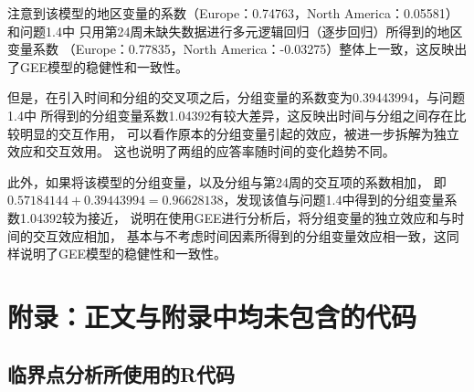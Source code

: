 \documentclass{article}
\begin{document}
注意到该模型的地区变量的系数（Europe：0.74763，North America：0.05581）和问题1.4中
只用第24周未缺失数据进行多元逻辑回归（逐步回归）所得到的地区变量系数
（Europe：0.77835，North America：-0.03275）整体上一致，这反映出了GEE模型的稳健性和一致性。

但是，在引入时间和分组的交叉项之后，分组变量的系数变为0.39443994，与问题1.4中
所得到的分组变量系数1.04392有较大差异，这反映出时间与分组之间存在比较明显的交互作用，
可以看作原本的分组变量引起的效应，被进一步拆解为独立效应和交互效用。
这也说明了两组的应答率随时间的变化趋势不同。

此外，如果将该模型的分组变量，以及分组与第24周的交互项的系数相加，
即$0.57184144+0.39443994 =0.96628138$，发现该值与问题1.4中得到的分组变量系数1.04392较为接近，
说明在使用GEE进行分析后，将分组变量的独立效应和与时间的交互效应相加，
基本与不考虑时间因素所得到的分组变量效应相一致，这同样说明了GEE模型的稳健性和一致性。







\section*{附录：正文与附录中均未包含的代码}
\subsection*{临界点分析所使用的R代码}


\end{document}
